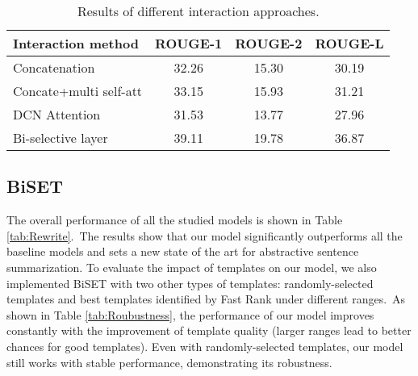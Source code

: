 \documentclass[11pt,a4paper]{article}
\begin{document}
\begin{spacing}{1.0}
\begin{table}[h]
\small

	\centering
	\begin{tabular}{@{}l|ccc@{}}
		\toprule
        Interaction method& ROUGE-1   & ROUGE-2  & ROUGE-L  \\
        \hline
        Concatenation  & 32.26 & 15.30 & 30.19 \\
        Concate+multi self-att  & 33.15 & 15.93 & 31.21 \\
        DCN Attention   & 31.53 & 13.77 & 27.96 \\
        Bi-selective layer &39.11 & 19.78 & 36.87 \\
        \bottomrule
	\end{tabular}
	\caption{Results of different interaction approaches.}
\label{tab:Interaction}
\end{table}

\subsection{BiSET}
The overall performance of all the studied models is shown in Table \ref{tab:Rewrite}.~The results show that our model significantly outperforms all the baseline models and sets a new state of the art for abstractive sentence summarization. To evaluate the impact of templates on our model, we also implemented BiSET with two other types of templates: randomly-selected templates and best templates identified by Fast Rank under different ranges.~As shown in Table \ref{tab:Roubustness}, the performance of our model improves constantly with the improvement of template quality (larger ranges lead to better chances for good templates). Even with randomly-selected templates, our model still works with stable performance, demonstrating its robustness.



\end{spacing}
\end{document}
